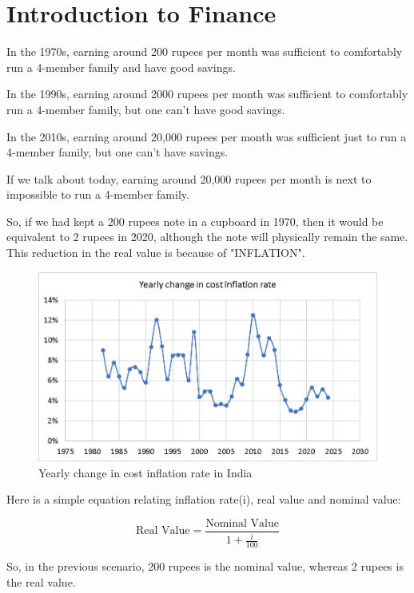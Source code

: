 \documentclass{report}
\begin{document}
\section{Introduction to Finance}


In the 1970s, earning around 200 rupees per month was sufficient to comfortably run a 4-member family and have good savings.


In the 1990s, earning around 2000 rupees per month was sufficient to comfortably run a 4-member family, but one can't have good savings.


In the 2010s, earning around 20,000 rupees per month was sufficient just to run a 4-member family, but one can't have savings.


If we talk about today, earning around 20,000 rupees per month is next to impossible to run a 4-member family.


So, if we had kept a 200 rupees note in a cupboard in 1970, then it would be equivalent to 2 rupees in 2020, although the note will physically remain the same. This reduction in the real value is because of "INFLATION".

\begin{figure}[h!]
     \centering
     \includegraphics[width=\textwidth]{in.jpg}
     \caption{Yearly change in cost inflation rate in India}
     \label{fig:in}
\end{figure}


Here is a simple equation relating inflation rate(i), real value and nominal value:

\begin{equation}
    \text{Real Value} = \frac{\text{Nominal Value}}{1+\frac{i}{100}}
\end{equation}

So, in the previous scenario, 200 rupees is the nominal value, whereas 2 rupees is the real value.
\end{document}
